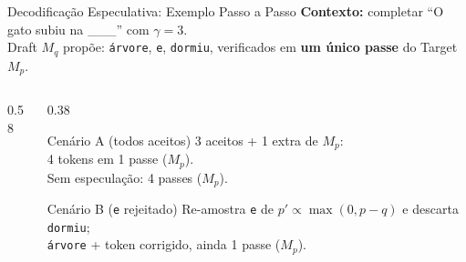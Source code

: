 \documentclass[aspectratio=169, xcolor=dvipsnames]{beamer}
\begin{document}
  \begin{frame}{Decodificação Especulativa: Exemplo Passo a Passo}
    \small
    \textbf{Contexto:} completar \enquote{O gato subiu na \_\_\_} com $\gamma=3$.\\[0.3em]
    Draft $M_q$ propõe: \texttt{árvore}, \texttt{e}, \texttt{dormiu}, verificados em \textbf{um único passe} do Target $M_p$.\\[0.4em]
    \begin{columns}[T]
      \begin{column}{0.58\textwidth}
      \end{column}
      \begin{column}{0.38\textwidth}
        \begin{exampleblock}{Cenário A (todos aceitos)}
          3 aceitos + 1 extra de $M_p$:\\
          4 tokens em 1 passe ($M_p$).\\
          Sem especulação: 4 passes ($M_p$).
        \end{exampleblock}
        \vspace{0.3em}
        \begin{alertblock}{Cenário B (\texttt{e} rejeitado)}
          Re-amostra \texttt{e} de $p'\!\propto\!\max(0,p{-}q)$ e descarta \texttt{dormiu};\\
          \texttt{árvore} + token corrigido, ainda 1 passe ($M_p$).
        \end{alertblock}
      \end{column}
    \end{columns}
  \end{frame}
\end{document}
